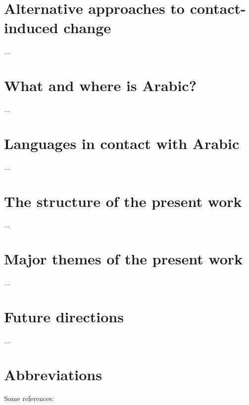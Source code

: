 \documentclass[output=paper]{langsci/langscibook}
\begin{document}
\section{Alternative approaches to contact-induced change} 
...

\section{What and where is Arabic?}
...

\section{Languages in contact with Arabic}
...

\section{The structure of the present work}
...

\section{Major themes of the present work}
...

\section{Future directions}
...

\section*{Abbreviations}

Some references:\\
\\
\citet{Jastrow2002}\\
\citet{Owens2000editor}\\
\citet{Owens2018}\\
\citet{Watson2011dialectsoverview}



\sloppy
\printbibliography[heading=subbibliography,notkeyword=this] 
\end{document}
